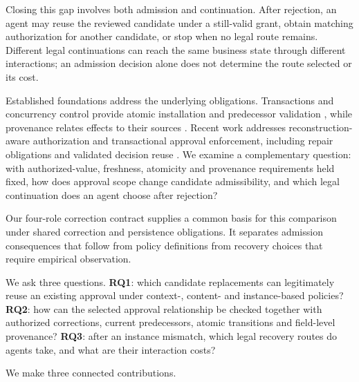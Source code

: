 \documentclass[pdflatex,sn-basic]{sn-jnl}
\begin{document}
Closing this gap involves both admission and continuation. After rejection, an agent may reuse the reviewed candidate under a still-valid grant, obtain matching authorization for another candidate, or stop when no legal route remains. Different legal continuations can reach the same business state through different interactions; an admission decision alone does not determine the route selected or its cost.

Established foundations address the underlying obligations. Transactions and concurrency control provide atomic installation and predecessor validation \citep{gray-transaction,kung-occ}, while provenance relates effects to their sources \citep{buneman-provenance}. Recent work addresses reconstruction-aware authorization and transactional approval enforcement, including repair obligations and validated decision reuse \citep{zhu2026resa,bindschaedler2026guarded}. We examine a complementary question: with authorized-value, freshness, atomicity and provenance requirements held fixed, how does approval scope change candidate admissibility, and which legal continuation does an agent choose after rejection?

Our four-role correction contract supplies a common basis for this comparison under shared correction and persistence obligations. It separates admission consequences that follow from policy definitions from recovery choices that require empirical observation.

We ask three questions. \textbf{RQ1}: which candidate replacements can legitimately reuse an existing approval under context-, content- and instance-based policies? \textbf{RQ2}: how can the selected approval relationship be checked together with authorized corrections, current predecessors, atomic transitions and field-level provenance? \textbf{RQ3}: after an instance mismatch, which legal recovery routes do agents take, and what are their interaction costs?

We make three connected contributions.
\end{document}
